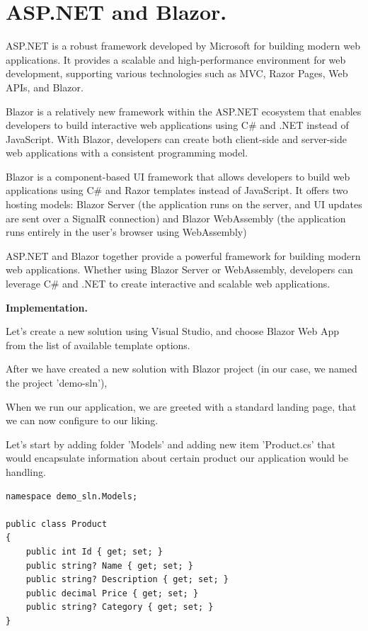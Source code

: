 
\pagebreak
\chapter{ASP.NET and Blazor.}


\medskip

ASP.NET is a robust framework developed by Microsoft for building modern web applications. It provides a scalable and high-performance environment for web development, supporting various technologies such as MVC, Razor Pages, Web APIs, and Blazor.

Blazor is a relatively new framework within the ASP.NET ecosystem that enables developers to build interactive web applications using C\# and .NET instead of JavaScript. With Blazor, developers can create both client-side and server-side web applications with a consistent programming model.

Blazor is a component-based UI framework that allows developers to build web applications using C\# and Razor templates instead of JavaScript. It offers two hosting models: Blazor Server (the application runs on the server, and UI updates are sent over a SignalR connection) and Blazor WebAssembly (the application runs entirely in the user's browser using WebAssembly)

ASP.NET and Blazor together provide a powerful framework for building modern web applications. Whether using Blazor Server or WebAssembly, developers can leverage C\# and .NET to create interactive and scalable web applications.


\textbf{Implementation.}

Let's create a new solution using Visual Studio, and choose Blazor Web App from the list of available template options.

After we have created a new solution with Blazor project (in our case, we named the project 'demo-sln'),

When we run our application, we are greeted with a standard landing page, that we can now configure to our liking.


Let's start by adding folder 'Models' and adding new item 'Product.cs' that would encapsulate information about certain product our application would be handling.

\begin{lstlisting}
namespace demo_sln.Models;

public class Product
{
    public int Id { get; set; }
    public string? Name { get; set; }
    public string? Description { get; set; }
    public decimal Price { get; set; }
    public string? Category { get; set; }
}

\end{lstlisting}

